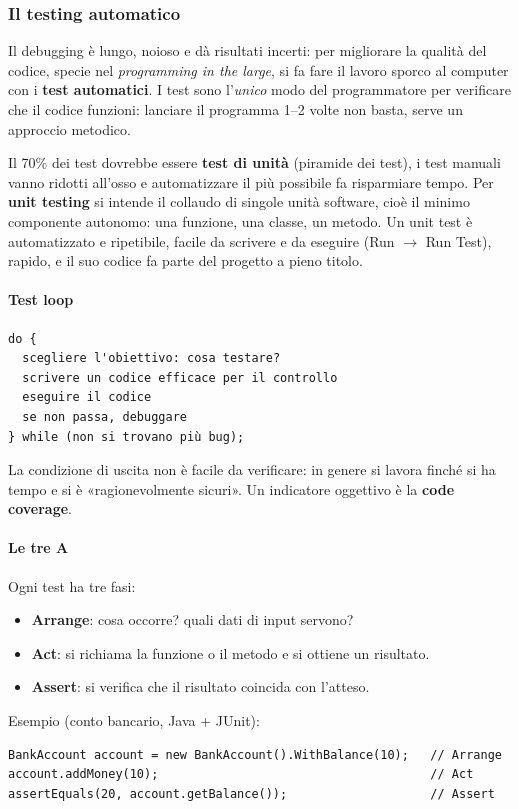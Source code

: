 \documentclass[a4paper,12pt]{article}
\begin{document}
\subsubsection{Il testing automatico}
Il debugging è lungo, noioso e dà risultati incerti: per migliorare la qualità del codice,
specie nel \emph{programming in the large}, si fa fare il lavoro sporco al computer con
i \textbf{test automatici}. I test sono l'\emph{unico} modo del programmatore per
verificare che il codice funzioni: lanciare il programma 1--2 volte non basta, serve un
approccio metodico.

Il 70\% dei test dovrebbe essere \textbf{test di unità} (piramide dei test), i test
manuali vanno ridotti all'osso e automatizzare il più possibile fa risparmiare tempo.
Per \textbf{unit testing} si intende il collaudo di singole unità software, cioè il
minimo componente autonomo: una funzione, una classe, un metodo. Un unit test è
automatizzato e ripetibile, facile da scrivere e da eseguire (Run $\rightarrow$ Run Test),
rapido, e il suo codice fa parte del progetto a pieno titolo.

\paragraph{Test loop}
\begin{verbatim}
do {
  scegliere l'obiettivo: cosa testare?
  scrivere un codice efficace per il controllo
  eseguire il codice
  se non passa, debuggare
} while (non si trovano più bug);
\end{verbatim}
La condizione di uscita non è facile da verificare: in genere si lavora finché si ha tempo
e si è «ragionevolmente sicuri». Un indicatore oggettivo è la \textbf{code coverage}.

\paragraph{Le tre A} Ogni test ha tre fasi:
\begin{itemize}[nosep]
  \item \textbf{Arrange}: cosa occorre? quali dati di input servono?
  \item \textbf{Act}: si richiama la funzione o il metodo e si ottiene un risultato.
  \item \textbf{Assert}: si verifica che il risultato coincida con l'atteso.
\end{itemize}
Esempio (conto bancario, Java + JUnit):
\begin{verbatim}
BankAccount account = new BankAccount().WithBalance(10);   // Arrange
account.addMoney(10);                                      // Act
assertEquals(20, account.getBalance());                    // Assert
\end{verbatim}
\end{document}
